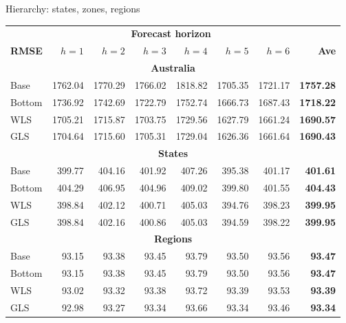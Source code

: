 \documentclass[14pt,ignorenonframetext,]{beamer}
\def\hl{\color[RGB]{230, 172, 0}}
\begin{document}
\begin{frame}{Hierarchy: states, zones, regions}
\protect\hypertarget{hierarchy-states-zones-regions}{}

\fontsize{10}{10.5}\sf\tabcolsep=0.12cm\vspace*{-0.6cm} \hspace*{-0.2cm}

\begin{tabular}{lrrrrrrr}
            & \multicolumn{6}{c}{\bf Forecast horizon} & \\
\textbf{RMSE} & $h=1$  & $h=2$ & $h=3$ & $h=4$ & $h=5$ & $h=6$ & \textbf{Ave}\\
\midrule
\multicolumn{8}{c}{\bf\alert{Australia}}\\
Base   & 1762.04    & 1770.29    & 1766.02     & 1818.82    & 1705.35    & 1721.17    & \bf 1757.28 \\
Bottom & 1736.92    & 1742.69    & 1722.79     & 1752.74    & 1666.73    & 1687.43    & \bf 1718.22 \\
WLS    & 1705.21    & 1715.87    & \hl 1703.75 & 1729.56    & 1627.79    & \hl1661.24 & \bf 1690.57 \\
GLS    & \hl1704.64 & \hl1715.60 & 1705.31     & \hl1729.04 & \hl1626.36 & 1661.64    & \bf \hl 1690.43 \\
\midrule
\multicolumn{8}{c}{\bf\alert{States}}\\
Base   & 399.77     & 404.16     & 401.92      & 407.26     & 395.38     & 401.17     & \bf 401.61 \\
Bottom & 404.29     & 406.95     & 404.96      & 409.02     & 399.80     & 401.55     & \bf 404.43 \\
WLS    & \hl 398.84 & \hl 402.12 & \hl 400.71  & \hl 405.03 & 394.76     & 398.23     & \bf \hl 399.95 \\
GLS    & \hl 398.84 & 402.16     & 400.86      & \hl 405.03 & \hl 394.59 & \hl 398.22 & \bf \hl 399.95 \\
\midrule
\multicolumn{8}{c}{\bf\alert{Regions}}\\
Base   & 93.15      & 93.38      & 93.45       & 93.79      & 93.50      & 93.56      & \bf 93.47 \\
Bottom & 93.15      & 93.38      & 93.45       & 93.79      & 93.50      & 93.56      & \bf 93.47 \\
WLS    & 93.02      & 93.32      & 93.38       & 93.72      & 93.39      & 93.53      & \bf 93.39 \\
GLS    & \hl 92.98  & \hl 93.27  & \hl 93.34   & \hl 93.66  & \hl 93.34  & \hl 93.46  & \bf \hl 93.34
\end{tabular}

\end{frame}
\end{document}
